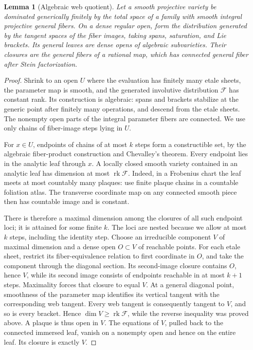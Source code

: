 \documentclass[11pt,letterpaper]{article}
\DeclareMathOperator{\rk}{rk}
\newtheorem{lemma}[theorem]{Lemma}
\theoremstyle{definition}
\theoremstyle{remark}
\begin{document}
\begin{lemma}[Algebraic web quotient]\label{proj:ex:web}
Let a smooth projective variety be dominated generically finitely by
the total space of a family with smooth integral projective general
fibers. On a dense regular open, form the distribution generated by
the tangent spaces of the fiber images, taking spans, saturation,
and Lie brackets. Its general leaves are dense opens of algebraic
subvarieties. Their closures are the general fibers of a rational
map, which has connected general fiber after Stein factorization.
\end{lemma}
\begin{proof}
Shrink to an open \(U\) where the evaluation has finitely many etale
sheets, the parameter map is smooth, and the generated involutive
distribution \(\mathcal F\) has constant rank. Its construction is
algebraic: spans and brackets stabilize at the generic point after
finitely many operations, and descend from the etale sheets. The
nonempty open parts of the integral parameter fibers are connected.
We use only chains of fiber-image steps lying in \(U\).

For \(x\in U\), endpoints of chains of at most \(k\) steps form a
constructible set, by the algebraic fiber-product construction and
Chevalley's theorem. Every endpoint lies in the analytic leaf
through \(x\). A locally closed smooth variety contained in an
analytic leaf has dimension at most \(\rk\mathcal F\). Indeed, in a
Frobenius chart the leaf meets at most countably many plaques: use
finite plaque chains in a countable foliation atlas. The transverse
coordinate map on any connected smooth piece then has countable
image and is constant.

There is therefore a maximal dimension among the closures of all
such endpoint loci; it is attained for some finite \(k\). The loci
are nested because we allow at most \(k\) steps, including the
identity step. Choose an irreducible component \(V\) of maximal
dimension and a dense open \(O\subset V\) of reachable points.
For each etale sheet, restrict its fiber-equivalence relation to
first coordinate in \(O\), and take the component through the
diagonal section. Its second-image closure contains \(O\), hence
\(V\), while its second image consists of endpoints reachable
in at most \(k+1\) steps. Maximality forces that closure to
equal \(V\). At a general
diagonal point, smoothness of the parameter map identifies its
vertical tangent with the corresponding web tangent. Every web
tangent is consequently tangent to \(V\), and so is every bracket. Hence
\(\dim V\geq\rk\mathcal F\), while the reverse inequality was proved
above. A plaque is thus open in \(V\). The equations of \(V\),
pulled back to the connected immersed leaf, vanish on a nonempty
open and hence on the entire leaf. Its closure is exactly \(V\).


\end{proof}
\end{document}
